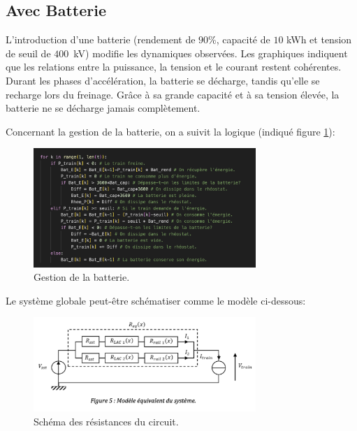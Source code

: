 \documentclass[11pt, a4paper, oneside, portrait]{report}
\begin{document}
        \subsection*{Avec Batterie}
            L’introduction d’une batterie (rendement de $90$\%{}, capacité de $10$ kWh et tension de seuil de $400$~kV) modifie les dynamiques observées. Les graphiques indiquent que les relations entre la
            puissance, la tension et le courant restent cohérentes. Durant les phases d’accélération, la
            batterie se décharge, tandis qu’elle se recharge lors du freinage. Grâce à sa grande capacité et à
            sa tension élevée, la batterie ne se décharge jamais complètement.

            Concernant la gestion de la batterie, on a suivit la logique (indiqué figure \ref{fig:AdamCode_1}):

            \begin{figure}[H]
                \centering
                \includegraphics[width=0.75\textwidth]{Figures/AdamCode_1.png}
                \caption{Gestion de la batterie.}
                \label{fig:AdamCode_1}
            \end{figure}

            Le système globale peut-être schématiser comme le modèle ci-dessous:

            \begin{figure}[H]
                \centering
                \includegraphics[width=0.75\textwidth]{Figures/AdamCode_2.png}
                \caption{Schéma des résistances du circuit.}
                \label{fig:AdamCode_2}
            \end{figure}
\end{document}

